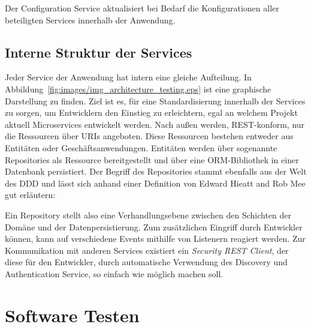 \documentclass[12pt,a4paper,bibliography=totocnumbered,listof=totocnumbered]{scrartcl}
\begin{document}
Der Configuration Service aktualisiert bei Bedarf die Konfigurationen aller beteiligten Services innerhalb der Anwendung.


\subsection{Interne Struktur der Services}

Jeder Service der Anwendung hat intern eine gleiche Aufteilung. In Abbildung~\ref{fig:images/img_architecture_testing.eps} ist eine graphische Darstellung zu finden. Ziel ist es, für eine Standardisierung innerhalb der Services zu sorgen, um Entwicklern den Einstieg zu erleichtern, egal an welchem Projekt aktuell Microservices entwickelt werden. Nach außen werden, REST-konform, nur die Ressourcen über \acp{URI} angeboten. Diese Ressourcen bestehen entweder aus Entitäten oder Geschäftsanwendungen. Entitäten werden über sogenannte Repositories als Ressource bereitgestellt und über eine \ac{ORM}-Bibliothek in einer Datenbank persistiert. Der Begriff des Repositories stammt ebenfalls aus der Welt des \ac{DDD} und lässt sich anhand einer Definition von Edward Hieatt and Rob Mee gut erläutern\cite{hieatt}:


Ein Repository stellt also eine Verhandlungsebene zwischen den Schichten der Domäne und der Datenpersistierung.
Zum zusätzlichen Eingriff durch Entwickler können, kann auf verschiedene Events mithilfe von Listenern reagiert werden. Zur Kommunikation mit anderen Services existiert ein \textit{Security REST Client}, der diese für den Entwickler, durch automatische Verwendung des Discovery und Authentication Service, so einfach wie möglich machen soll. 



\section{Software Testen}
\end{document}
